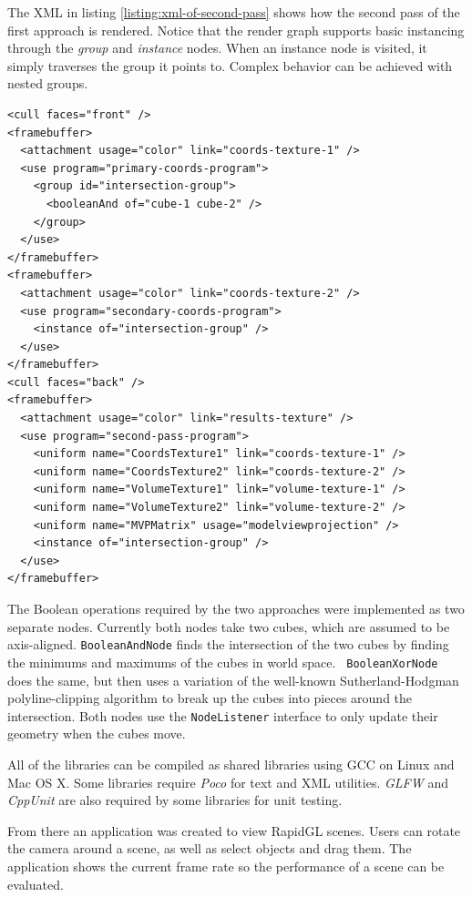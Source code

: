 \documentclass{report}
\begin{document}
The XML in listing \ref{listing:xml-of-second-pass} shows how the second pass of
the first approach is rendered.  Notice that the render graph supports basic
instancing through the {\em group} and {\em instance} nodes.  When an instance
node is visited, it simply traverses the group it points to.  Complex behavior
can be achieved with nested groups.

\lstset{language=XML}
\lstset{markfirstintag=true}
\lstset{showstringspaces=false}
\lstset{caption=XML of second pass for first approach.}
\lstset{label=listing:xml-of-second-pass}
\begin{lstlisting}[frame=single,float]
<cull faces="front" />
<framebuffer>
  <attachment usage="color" link="coords-texture-1" />
  <use program="primary-coords-program">
    <group id="intersection-group">
      <booleanAnd of="cube-1 cube-2" />
    </group>
  </use>
</framebuffer>
<framebuffer>
  <attachment usage="color" link="coords-texture-2" />
  <use program="secondary-coords-program">
    <instance of="intersection-group" />
  </use>
</framebuffer>
<cull faces="back" />
<framebuffer>
  <attachment usage="color" link="results-texture" />
  <use program="second-pass-program">
    <uniform name="CoordsTexture1" link="coords-texture-1" />
    <uniform name="CoordsTexture2" link="coords-texture-2" />
    <uniform name="VolumeTexture1" link="volume-texture-1" />
    <uniform name="VolumeTexture2" link="volume-texture-2" />
    <uniform name="MVPMatrix" usage="modelviewprojection" />
    <instance of="intersection-group" />
  </use>
</framebuffer>
\end{lstlisting}

The Boolean operations required by the two approaches were implemented as two
separate nodes.  Currently both nodes take two cubes, which are assumed to be
axis-aligned.  {\tt BooleanAndNode} finds the intersection of the two cubes by
finding the minimums and maximums of the cubes in world space.  {\tt
BooleanXorNode} does the same, but then uses a variation of the well-known
Sutherland-Hodgman polyline-clipping algorithm to break up the cubes into pieces
around the intersection.  Both nodes use the {\tt NodeListener} interface to
only update their geometry when the cubes move.

All of the libraries can be compiled as shared libraries using GCC on Linux and
Mac OS X.  Some libraries require {\em Poco} for text and XML utilities.  {\em
GLFW} and {\em CppUnit} are also required by some libraries for unit testing.

From there an application was created to view RapidGL scenes.  Users can
rotate the camera around a scene, as well as select objects and drag them.  The
application shows the current frame rate so the performance of a scene can be
evaluated.
\end{document}
